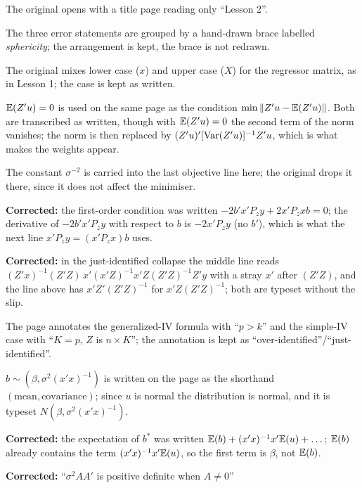 \documentclass[11pt]{article}
\begin{document}
\begin{transcriptnotes}
  \item The original opens with a title page reading only ``Lesson 2''.
  \item The three error statements are grouped by a hand-drawn brace labelled
        \emph{sphericity}; the arrangement is kept, the brace is not redrawn.
  \item The original mixes lower case ($x$) and upper case ($X$) for the regressor
        matrix, as in Lesson 1; the case is kept as written.
  \item $\mathbb{E}(Z'u)=0$ is used on the same page as the condition $\min\|Z'u-\mathbb{E}(Z'u)\|$.
        Both are transcribed as written, though with $\mathbb{E}(Z'u)=0$ the second term of
        the norm vanishes; the norm is then replaced by
        $(Z'u)'[\operatorname{Var}(Z'u)]^{-1}Z'u$, which is what makes the weights appear.
  \item The constant $\sigma^{-2}$ is carried into the last objective line here; the
        original drops it there, since it does not affect the minimiser.
  \item \textbf{Corrected:} the first-order condition was written
        $-2b'x'P_zy+2x'P_zxb=0$; the derivative of $-2b'x'P_zy$ with respect to $b$
        is $-2x'P_zy$ (no $b'$), which is what the next line
        $x'P_zy=(x'P_zx)b$ uses.
  \item \textbf{Corrected:} in the just-identified collapse the middle line reads
        $(Z'x)^{-1}(Z'Z)\,x'(x'Z)^{-1}x'Z(Z'Z)^{-1}Z'y$ with a stray $x'$ after
        $(Z'Z)$, and the line above has $x'Z'(Z'Z)^{-1}$ for $x'Z(Z'Z)^{-1}$; both
        are typeset without the slip.
  \item The page annotates the generalized-IV formula with ``$p>k$'' and the
        simple-IV case with ``$K=p$, $Z$ is $n\times K$''; the annotation is kept
        as ``over-identified''/``just-identified''.
  \item $b\sim(\beta,\sigma^{2}(x'x)^{-1})$ is written on the page as the shorthand
        $(\text{mean},\text{covariance})$; since $u$ is normal the distribution is
        normal, and it is typeset $N(\beta,\sigma^{2}(x'x)^{-1})$.
  \item \textbf{Corrected:} the expectation of $b^{*}$ was written
        $\mathbb{E}(b)+(x'x)^{-1}x'\mathbb{E}(u)+\dots$; $\mathbb{E}(b)$ already contains the term
        $(x'x)^{-1}x'\mathbb{E}(u)$, so the first term is $\beta$, not $\mathbb{E}(b)$.
  \item \textbf{Corrected:} ``$\sigma^{2}AA'$ is positive definite when $A\ne0$''

\end{transcriptnotes}
\end{document}
